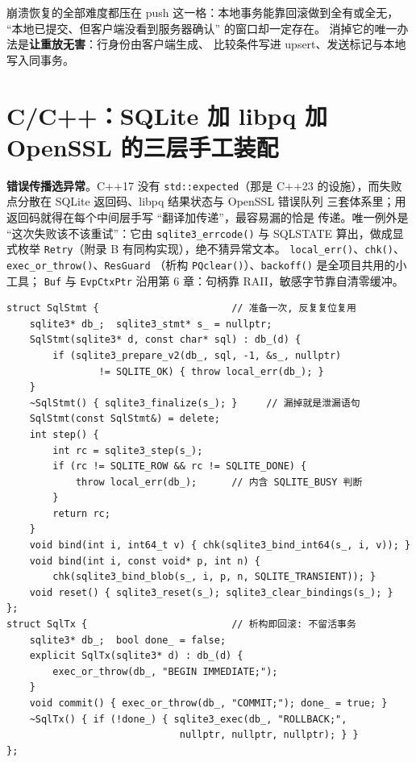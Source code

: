 \documentclass[12pt,a4paper,fontset=fandol]{ctexbook}
\newcommand{\cpp}[1]{C++#1}
\newcommand{\Fn}[1]{\texttt{#1()}}
\newcommand{\Tp}[1]{\texttt{#1}}
\newcommand{\CppJava}{C/C++}
\begin{document}
\begin{note}[title=契约里为什么专门写 ``幂等'']
崩溃恢复的全部难度都压在 push 这一格：本地事务能靠回滚做到全有或全无，
``本地已提交、但客户端没看到服务器确认'' 的窗口却一定存在。
消掉它的唯一办法是\textbf{让重放无害}：行身份由客户端生成、
比较条件写进 upsert、发送标记与本地写入同事务。
\end{note}

\section{\CppJava{}：SQLite 加 libpq 加 OpenSSL 的三层手工装配}

\textbf{错误传播选异常}。\cpp{17} 没有 \Tp{std::expected}（那是 \cpp{23}
的设施），而失败点分散在 SQLite 返回码、libpq 结果状态与 OpenSSL 错误队列
三套体系里；用返回码就得在每个中间层手写 ``翻译加传递''，最容易漏的恰是
传递。唯一例外是 ``这次失败该不该重试''：它由 \Fn{sqlite3\_errcode} 与
SQLSTATE 算出，做成显式枚举 \Tp{Retry}（附录 B 有同构实现），绝不猜异常文本。
\Fn{local\_err}、\Fn{chk}、\Fn{exec\_or\_throw}、\Tp{ResGuard}
（析构 \Fn{PQclear}）、\Fn{backoff} 是全项目共用的小工具；
\Tp{Buf} 与 \Tp{EvpCtxPtr} 沿用第 6 章：句柄靠 RAII，敏感字节靠自清零缓冲。

\begin{lstlisting}[caption={C/C++：语句与事务的薄 RAII 包装}]
struct SqlStmt {                       // 准备一次, 反复复位复用
    sqlite3* db_;  sqlite3_stmt* s_ = nullptr;
    SqlStmt(sqlite3* d, const char* sql) : db_(d) {
        if (sqlite3_prepare_v2(db_, sql, -1, &s_, nullptr)
                != SQLITE_OK) { throw local_err(db_); }
    }
    ~SqlStmt() { sqlite3_finalize(s_); }     // 漏掉就是泄漏语句
    SqlStmt(const SqlStmt&) = delete;
    int step() {
        int rc = sqlite3_step(s_);
        if (rc != SQLITE_ROW && rc != SQLITE_DONE) {
            throw local_err(db_);      // 内含 SQLITE_BUSY 判断
        }
        return rc;
    }
    void bind(int i, int64_t v) { chk(sqlite3_bind_int64(s_, i, v)); }
    void bind(int i, const void* p, int n) {
        chk(sqlite3_bind_blob(s_, i, p, n, SQLITE_TRANSIENT)); }
    void reset() { sqlite3_reset(s_); sqlite3_clear_bindings(s_); }
};
struct SqlTx {                         // 析构即回滚: 不留活事务
    sqlite3* db_;  bool done_ = false;
    explicit SqlTx(sqlite3* d) : db_(d) {
        exec_or_throw(db_, "BEGIN IMMEDIATE;");
    }
    void commit() { exec_or_throw(db_, "COMMIT;"); done_ = true; }
    ~SqlTx() { if (!done_) { sqlite3_exec(db_, "ROLLBACK;",
                              nullptr, nullptr, nullptr); } }
};
\end{lstlisting}
\end{document}
